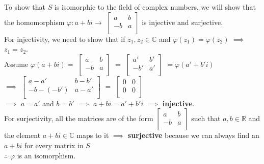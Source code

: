 \documentclass[11pt]{article}
\theoremstyle{definition}
\numberwithin{equation}{section}
\newcommand{\R}{\mathbb{R}}  %
\newcommand{\C}{\mathbb{C}}  %
\begin{document}
To show that $S$ is isomorphic to the field of complex numbers, we will show that the homomorphism $\varphi: a+bi \rightarrow $
$\begin{bmatrix}
a  &b\\
-b &a\\
\end{bmatrix}$
is injective and surjective.\\
For injectivity, we need to show that if $z_{1}, z_{2} \in \C$ and $\varphi(z_{1}) = \varphi(z_{2})$ $\implies$ $z_{1} = z_{2}$.\\ Assume $\varphi(a+bi) = $
$\begin{bmatrix}
a  &b\\
-b &a\\
\end{bmatrix}$
$=$
$\begin{bmatrix}
a'  &b'\\
-b' &a'\\
\end{bmatrix}$
$= \varphi(a' + b'i)$\\
$\implies$
$\begin{bmatrix}
a-a'        &b-b'\\
-b-(-b')    &a-a'\\
\end{bmatrix}$
$=$
$\begin{bmatrix}
0   &0\\
0   &0\\
\end{bmatrix}$\\
$\implies$ $a = a'$ and $b = b'$ $\implies$ $a+bi = a' + b'i$ $\implies$ \textbf{injective}.\\
For surjectivity, all the matrices are of the form
$\begin{bmatrix}
a   &b\\
-b  &a\\
\end{bmatrix}$
 such that $a, b \in \R$ and the element $a+bi \in \C$ maps to it $\implies$ \textbf{surjective} because we can always find an $a+bi$ for every matrix in $S$\\
 $\therefore$ $\varphi$ is an isomorphism.
\end{document}
